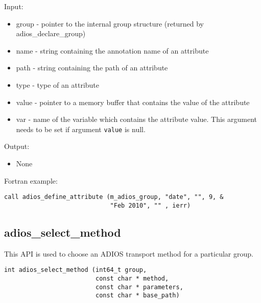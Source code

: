 Input:
\begin{itemize}
\item group - pointer to the internal group structure (returned by adios\_declare\_group)

\item name - string containing the annotation name of an attribute

\item path - string containing the path of an attribute

\item type  - type of an attribute

\item value - pointer to a memory buffer that contains the value of the attribute

\item var - name of the variable which contains the attribute value. This argument needs 
to be set if argument \verb+value+ is null.  
\end{itemize}

Output:
\begin{itemize}
\item None
\end{itemize}

Fortran example: 
\begin{lstlisting}[alsolanguage=Fortran,caption={},label={}]
call adios_define_attribute (m_adios_group, "date", "", 9, &
                             "Feb 2010", "" , ierr)
\end{lstlisting}


\subsection{adios\_select\_method}
This API is used to choose an ADIOS transport method for a particular group. 

\begin{lstlisting}[alsolanguage=C,caption={},label={}]
int adios_select_method (int64_t group, 
                         const char * method,
                         const char * parameters,
                         const char * base_path)
\end{lstlisting}

